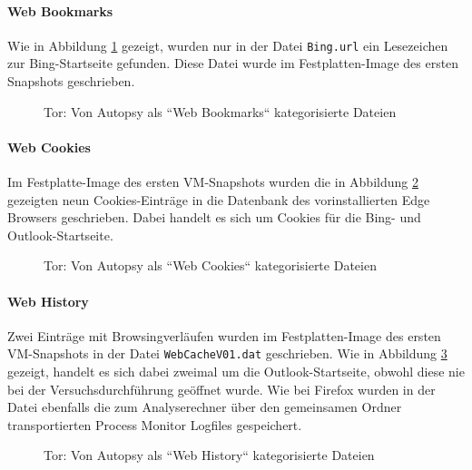 \begin{appendices}
\paragraph*{Web Bookmarks}
Wie in Abbildung \ref{img:tor-web-bookmarks} gezeigt, wurden nur in der Datei \texttt{Bing.url} ein Lesezeichen zur Bing-Startseite gefunden. Diese Datei wurde im Festplatten-Image des ersten Snapshots geschrieben.
\begin{figure}[h!]
	\centerline{} 
	\caption{Tor: Von Autopsy als ``Web Bookmarks`` kategorisierte Dateien}
	\label{img:tor-web-bookmarks} 
\end{figure}

\paragraph*{Web Cookies}
Im Festplatte-Image des ersten VM-Snapshots wurden die in Abbildung \ref{img:tor-web-cookies} gezeigten neun Cookies-Einträge in die Datenbank des vorinstallierten Edge Browsers geschrieben. Dabei handelt es sich um Cookies für die Bing- und Outlook-Startseite.
\begin{figure}[h!]
	\centerline{} 
	\caption{Tor: Von Autopsy als ``Web Cookies`` kategorisierte Dateien}
	\label{img:tor-web-cookies} 
\end{figure}

\paragraph*{Web History}
Zwei Einträge mit Browsingverläufen wurden im Festplatten-Image des ersten VM-Snapshots in der Datei \texttt{WebCacheV01.dat} geschrieben. Wie in Abbildung \ref{img:tor-web-history} gezeigt, handelt es sich dabei zweimal um die Outlook-Startseite, obwohl diese nie bei der Versuchsdurchführung geöffnet wurde. Wie bei Firefox wurden in der Datei ebenfalls die zum Analyserechner über den gemeinsamen Ordner transportierten Process Monitor Logfiles gespeichert.
\begin{figure}[h!]
	\centerline{}
	\caption{Tor: Von Autopsy als ``Web History`` kategorisierte Dateien}
	\label{img:tor-web-history}  
\end{figure}


\end{appendices}
